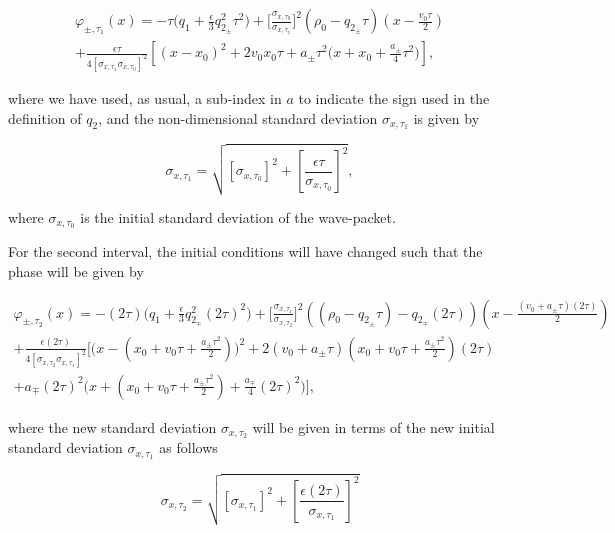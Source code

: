\documentclass{article}
\begin{document}
\begin{multline}\label{quantum_phase_ignored_terms_simplified_t1}
\varphi_{\pm, \tau_{1}}(x) =-\tau \bigg(q_{1} + \frac{\epsilon}{3} q_{2_{\pm}}^{2} \tau^{2}\bigg) + \bigg[\frac{\sigma_{x, \tau_{0}}}{\sigma_{x, \tau_{1}}}\bigg]^{2}(\rho_{0} - q_{2_{\pm}} \tau)(x-\frac{v_{0} \tau}{2}) \\
+ \frac{\epsilon \tau}{4 [\sigma_{x, \tau_{1}}\sigma_{x, \tau_{0}}]^{2}} \left[(x-x_{0})^{2} + 2v_{0} x_{0} \tau +a_{\pm} \tau^{2} \bigg(x+x_{0}+ \frac{a_{\pm}}{4} \tau^{2} \bigg)\right],
\end{multline}

where we have used, as usual, a sub-index in $a$ to indicate the sign used in the definition of $q_{2}$, and the non-dimensional standard deviation $\sigma_{x, \tau_{1}}$ is given by 

\begin{equation}\label{sigma_x_t1}
\sigma_{x, \tau_{1}} = \sqrt{[\sigma_{x, \tau_{0}}]^{2} + \left[\frac{\epsilon \tau}{\sigma_{x, \tau_{0}}} \right]^{2}},
\end{equation}

where $\sigma_{x, \tau_{0}}$ is the initial standard deviation of the wave-packet.

For the second interval, the initial conditions will have changed such that the phase will be given by

\begin{multline}\label{quantum_phase_ignored_terms_simplified_t2}
\varphi_{\pm, \tau_{2}}(x) = -(2\tau) \bigg(q_{1} + \frac{\epsilon}{3} q_{2_{\mp}}^{2} (2\tau)^{2}\bigg) + \bigg[\frac{\sigma_{x, \tau_{1}}}{\sigma_{x, \tau_{2}}}\bigg]^{2}((\rho_{0} - q_{2_{\pm}} \tau)-q_{2_{\mp}} (2\tau))(x-\frac{(v_{0}+a_{\pm}\tau) (2\tau)}{2})\\ 
+\frac{\epsilon (2\tau)}{4 [\sigma_{x, \tau_{2}}\sigma_{x, \tau_{1}}]^{2}} \bigg[\bigg(x-(x_{0}+v_{0} \tau + \frac{a_{\pm}\tau^{2}}{2})\bigg)^{2}
+ 2(v_{0} + a_{\pm} \tau) (x_{0}+v_{0} \tau + \frac{a_{\pm}\tau^{2}}{2}) (2\tau) \\ 
+a_{\mp} (2\tau)^{2} \bigg(x+(x_{0}+v_{0} \tau + \frac{a_{\pm}\tau^{2}}{2})+ \frac{a_{\mp}}{4} (2\tau)^{2} \bigg)\bigg],
\end{multline}

where the new standard deviation $\sigma_{x, \tau_{2}}$ will be given in terms of the new initial standard deviation $\sigma_{x, \tau_{1}}$ as follows

\begin{equation}\label{sigma_x_t2}
\sigma_{x, \tau_{2}} = \sqrt{[\sigma_{x, \tau_{1}}]^{2} + \left[\frac{\epsilon (2\tau)}{\sigma_{x, \tau_{1}}} \right]^{2}}
\end{equation}
\end{document}
